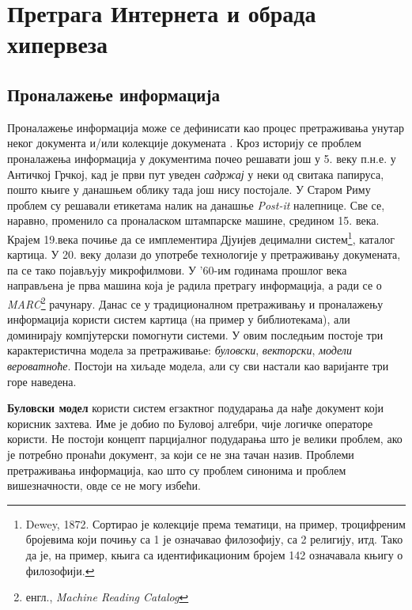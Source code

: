 \section{Претрага Интернета и обрада хипервеза}

\subsection{Проналажење информација}

Проналажење информација може се дефинисати као процес претраживања унутар неког документа и/или колекције докумената \cite{langville2011google}. Кроз историју се проблем проналажења информација у документима почео решавати још у 5. веку п.н.е. у Античкој Грчкој, кад је први пут уведен \emph{садржај} у неки од свитака папируса, пошто књиге у данашњем облику тада још нису постојале. У Старом Риму проблем су решавали етикетама налик на данашње \emph{Post-it} налепнице. Све се, наравно, променило са проналаском штампарске машине, средином 15. века. Крајем 19.века почиње да се имплементира Дјуијев децимални систем\footnote{Dewey, 1872. Сортирао је колекције према тематици, на пример, троцифреним бројевима који почињу са 1 је означавао филозофију, са 2 религију, итд. Тако да је, на пример, књига са идентификационим бројем 142 означавала књигу о филозофији.}, каталог картица. У 20. веку долази до употребе технологије у претраживању докумената, па се тако појављују микрофилмови. У '60-им годинама прошлог века направљена је прва машина која је радила претрагу информација, а ради се о \emph{MARC}\footnote{енгл., \emph{Machine Reading Catalog}} рачунару. Данас се у традиционалном претраживању и проналажењу информација користи систем картица (на пример у библиотекама), али доминирају компјутерски помогнути системи. У овим последњим постоје три карактеристична модела за претраживање: \emph{буловски}, \emph{векторски}, \emph{модели вероватноће}\cite[Ch 1.2]{langville2011google}. Постоји на хиљаде модела, али су сви настали као варијанте три горе наведена.

\textbf{Буловски модел} користи систем егзактног подударања да нађе документ који корисник захтева. Име је добио по Буловој алгебри, чије логичке операторе користи. Не постоји концепт парцијалног подударања што је велики проблем, ако је потребно пронаћи документ, за који се не зна тачан назив. Проблеми претраживања информација, као што су проблем синонима и проблем вишезначности, овде се не могу избећи.

